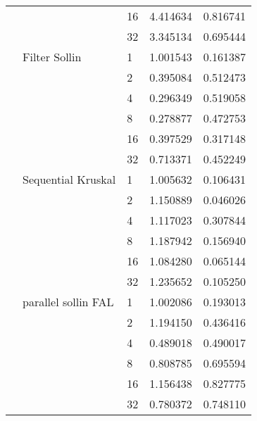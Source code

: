 \begin{tabular}{lllrr}
                                                       &                     & 16 &  4.414634 &  0.816741 \\
                                                       &                     & 32 &  3.345134 &  0.695444 \\
                                                       & Filter Sollin & 1  &  1.001543 &  0.161387 \\
                                                       &                     & 2  &  0.395084 &  0.512473 \\
                                                       &                     & 4  &  0.296349 &  0.519058 \\
                                                       &                     & 8  &  0.278877 &  0.472753 \\
                                                       &                     & 16 &  0.397529 &  0.317148 \\
                                                       &                     & 32 &  0.713371 &  0.452249 \\
                                                       & Sequential Kruskal & 1  &  1.005632 &  0.106431 \\
                                                       &                     & 2  &  1.150889 &  0.046026 \\
                                                       &                     & 4  &  1.117023 &  0.307844 \\
                                                       &                     & 8  &  1.187942 &  0.156940 \\
                                                       &                     & 16 &  1.084280 &  0.065144 \\
                                                       &                     & 32 &  1.235652 &  0.105250 \\
                                                       & parallel sollin FAL & 1  &  1.002086 &  0.193013 \\
                                                       &                     & 2  &  1.194150 &  0.436416 \\
                                                       &                     & 4  &  0.489018 &  0.490017 \\
                                                       &                     & 8  &  0.808785 &  0.695594 \\
                                                       &                     & 16 &  1.156438 &  0.827775 \\
                                                       &                     & 32 &  0.780372 &  0.748110 \\
\bottomrule
\end{tabular}
